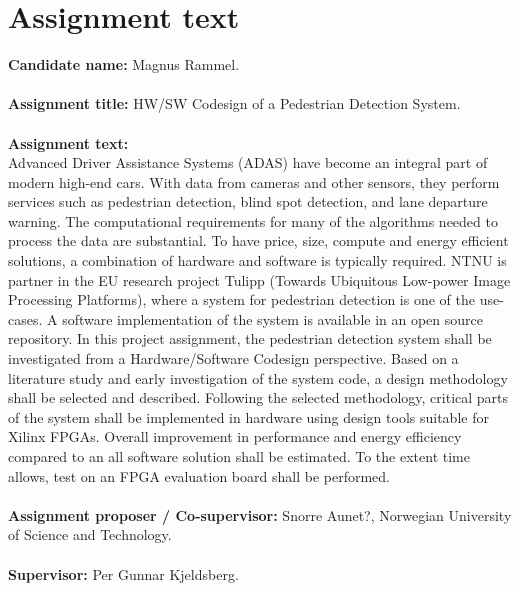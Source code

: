 \section*{Assignment text}

\textbf{Candidate name:} Magnus Rammel.\\\\
\textbf{Assignment title:} HW/SW Codesign of a Pedestrian Detection System. \\\\
\textbf{Assignment text:} \\
Advanced Driver Assistance Systems (ADAS) have become an integral part of modern high-end cars. With data from cameras and other sensors, they perform services such as pedestrian detection, blind spot detection, and lane departure warning. The computational requirements for many of the algorithms needed to process the data are substantial. To have price, size, compute and energy efficient solutions, a combination of hardware and software is typically required.  NTNU is partner in the EU research project Tulipp (Towards Ubiquitous Low-power Image Processing Platforms), where a system for pedestrian detection is one of the use-cases. A software implementation of the system is available in an open source repository. 
In this project assignment, the pedestrian detection system shall be investigated from a Hardware/Software Codesign perspective. Based on a literature study and early investigation of the system code, a design methodology shall be selected and described. Following the selected methodology, critical parts of the system shall be implemented in hardware using design tools suitable for Xilinx FPGAs. Overall improvement in performance and energy efficiency compared to an all software solution shall be estimated. To the extent time allows, test on an FPGA evaluation board shall be performed.\\\\
\textbf{Assignment proposer / Co-supervisor:} Snorre Aunet?, Norwegian University of Science and Technology.\\\\
\textbf{Supervisor:} Per Gunnar Kjeldsberg. \\\\\\\\\\


